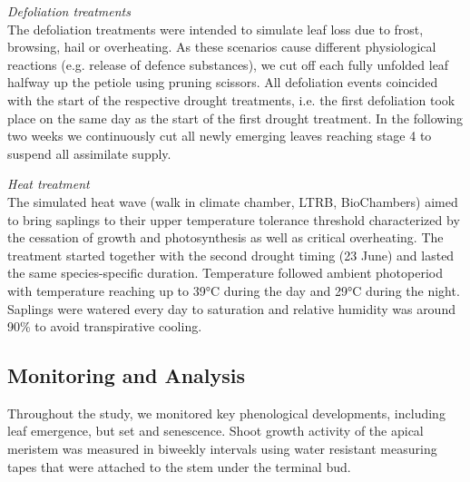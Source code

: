 \documentclass{article}
\begin{document}
	\textit{Defoliation treatments} \\
	The defoliation treatments were intended to simulate leaf loss due to frost, browsing, hail or overheating. As these scenarios cause different physiological reactions (e.g. release of defence substances), we cut off each fully unfolded leaf halfway up the petiole using pruning scissors. 
	All defoliation events coincided with the start of the respective drought treatments, i.e. the first defoliation took place on the same day as the start of the first drought treatment. In the following two weeks we continuously cut all newly emerging leaves reaching stage 4 to suspend all assimilate supply. %
	
	\textit{Heat treatment} \\
	The simulated heat wave (walk in climate chamber, LTRB, BioChambers) aimed to bring saplings to their upper temperature tolerance threshold characterized by the cessation of growth and photosynthesis as well as critical overheating. The treatment started together with the second drought timing (23 June) and lasted the same species-specific duration. Temperature followed ambient photoperiod with temperature reaching up to 39°C during the day and 29°C during the night. Saplings were watered every day to saturation and relative humidity was around 90\% to avoid transpirative cooling. 
	

	\subsection*{Monitoring and Analysis}

	Throughout the study, we monitored key phenological developments, including leaf emergence, but set and senescence. 
	Shoot growth activity of the apical meristem was measured in biweekly intervals using water resistant measuring tapes that were attached to the stem under the terminal bud. \\
	
\end{document}
